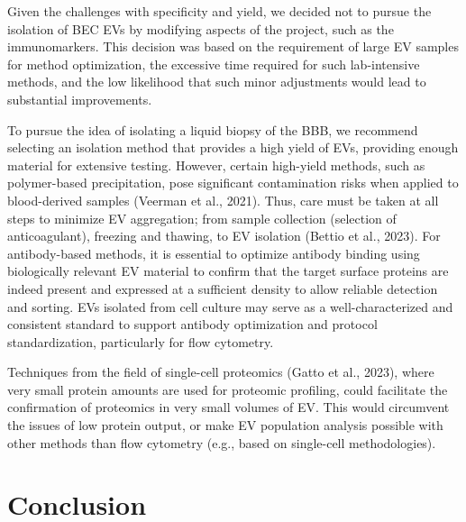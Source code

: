 \documentclass[authordate, empirical]{jote-new-article}
\begin{document}
	Given the challenges with specificity and yield, we decided not to pursue the isolation of BEC EVs by modifying aspects of the project, such as the immunomarkers. This decision was based on the requirement of large EV samples for method optimization, the excessive time required for such lab-intensive methods, and the low likelihood that such minor adjustments would lead to substantial improvements.



	To pursue the idea of isolating a liquid biopsy of the BBB, we recommend selecting an isolation method that provides a high yield of EVs, providing enough material for extensive testing. However, certain high-yield methods, such as polymer-based precipitation, pose significant contamination risks when applied to blood-derived samples (Veerman et al., 2021). Thus, care must be taken at all steps to minimize EV aggregation; from sample collection (selection of anticoagulant), freezing and thawing, to EV isolation (Bettio et al., 2023). For antibody-based methods, it is essential to optimize antibody binding using biologically relevant EV material to confirm that the target surface proteins are indeed present and expressed at a sufficient density to allow reliable detection and sorting. EVs isolated from cell culture may serve as a well-characterized and consistent standard to support antibody optimization and protocol standardization, particularly for flow cytometry.



	Techniques from the field of single-cell proteomics (Gatto et al., 2023), where very small protein amounts are used for proteomic profiling, could facilitate the confirmation of proteomics in very small volumes of EV. This would circumvent the issues of low protein output, or make EV population analysis possible with other methods than flow cytometry (e.g., based on single-cell methodologies).











	\section{Conclusion }
\end{document}
